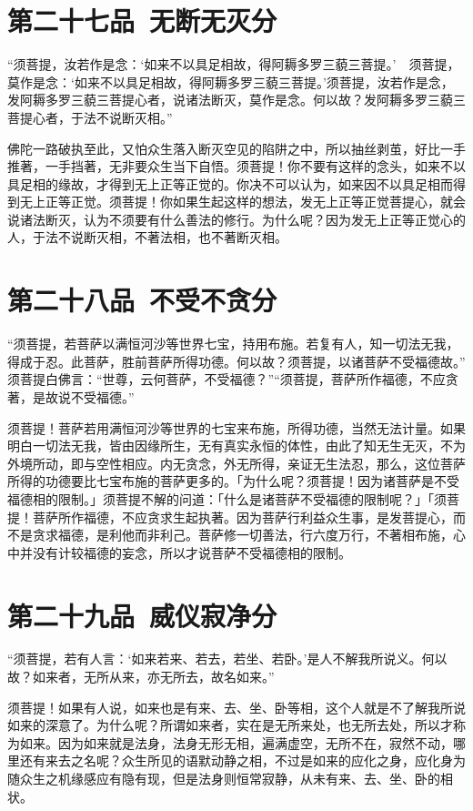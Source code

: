 \documentclass[12pt,twoside,openany]{book}
\newcommand{\kai}[1]{{\CJKfamily{kai}#1}}
\begin{document}
\chapter{第二十七品\ 无断无灭分}
“须菩提，汝若作是念：‘如来不以具足相故，得阿耨多罗三藐三菩提。’　须菩提，莫作是念：‘如来不以具足相故，得阿耨多罗三藐三菩提。’须菩提，汝若作是念，发阿耨多罗三藐三菩提心者，说诸法断灭，莫作是念。何以故？发阿耨多罗三藐三菩提心者，于法不说断灭相。”

\kai{佛陀一路破执至此，又怕众生落入断灭空见的陷阱之中，所以抽丝剥茧，好比一手推著，一手挡著，无非要众生当下自悟。须菩提！你不要有这样的念头，如来不以具足相的缘故，才得到无上正等正觉的。你决不可以认为，如来因不以具足相而得到无上正等正觉。须菩提！你如果生起这样的想法，发无上正等正觉菩提心，就会说诸法断灭，认为不须要有什么善法的修行。为什么呢？因为发无上正等正觉心的人，于法不说断灭相，不著法相，也不著断灭相。}

\chapter{第二十八品\ 不受不贪分}
“须菩提，若菩萨以满恒河沙等世界七宝，持用布施。若复有人，知一切法无我，得成于忍。此菩萨，胜前菩萨所得功德。何以故？须菩提，以诸菩萨不受福德故。”　须菩提白佛言：“世尊，云何菩萨，不受福德？”“须菩提，菩萨所作福德，不应贪著，是故说不受福德。”

\kai{须菩提！菩萨若用满恒河沙等世界的七宝来布施，所得功德，当然无法计量。如果明白一切法无我，皆由因缘所生，无有真实永恒的体性，由此了知无生无灭，不为外境所动，即与空性相应。内无贪念，外无所得，亲证无生法忍，那么，这位菩萨所得的功德要比七宝布施的菩萨更多的。「为什么呢？须菩提！因为诸菩萨是不受福德相的限制。」须菩提不解的问道：「什么是诸菩萨不受福德的限制呢？」「须菩提！菩萨所作福德，不应贪求生起执著。因为菩萨行利益众生事，是发菩提心，而不是贪求福德，是利他而非利己。菩萨修一切善法，行六度万行，不著相布施，心中并没有计较福德的妄念，所以才说菩萨不受福德相的限制。}


\chapter{第二十九品\ 威仪寂净分}
“须菩提，若有人言：‘如来若来、若去，若坐、若卧。’是人不解我所说义。何以故？如来者，无所从来，亦无所去，故名如来。”

\kai{须菩提！如果有人说，如来也是有来、去、坐、卧等相，这个人就是不了解我所说如来的深意了。为什么呢？所谓如来者，实在是无所来处，也无所去处，所以才称为如来。因为如来就是法身，法身无形无相，遍满虚空，无所不在，寂然不动，哪里还有来去之名呢？众生所见的语默动静之相，不过是如来的应化之身，应化身为随众生之机缘感应有隐有现，但是法身则恒常寂静，从未有来、去、坐、卧的相状。}
\end{document}

